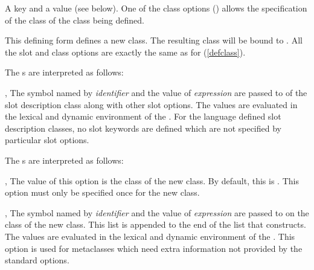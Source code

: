 \begin{optDefinition}
\begin{arguments}
    \item[\scref{class-option-1}] A key and a value (see below).  One of
    the class options () allows the specification of the class
    of the class being defined.
\end{arguments}
%
\remarks%
This defining form defines a new class.  The resulting class will be bound to
.  All the slot and class options are exactly the same as for
 (\ref{defclass}).

\noindent
The \/s are interpreted as follows:
\begin{options}
    \item[\scref{identifier}, \scref{level-1-form}]%
    The symbol named by {\em identifier} and the value of {\em expression} are
    passed to  of the slot description class along with other
    slot options.  The values are evaluated in the lexical and dynamic
    environment of the .  For the language defined slot
    description classes, no slot keywords are defined which are not specified by
    particular  slot options.
\end{options}
%
The \/s are interpreted as follows:
\begin{options}
    \item[\keyworddef{class}, \scref{class-name}]%
    The value of this option is the class of the new class.  By default, this is
    .  This option must only be specified once for the new
    class.

    \item[\scref{identifier}, \scref{level-1-form}]%
    The symbol named by {\em identifier} and the value of {\em expression} are
    passed to  on the class of the new class.  This list is
    appended to the end of the list that  constructs.  The
    values are evaluated in the lexical and dynamic environment of the
    .  This option is used for metaclasses which need extra
    information not provided by the standard options.
\end{options}
%
\end{optDefinition}


